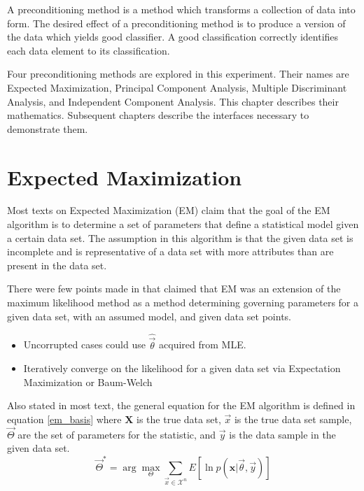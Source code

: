 \documentclass[12pt]{report}
\begin{document}
A preconditioning method is a method which transforms a collection of data into form.  The desired effect of a preconditioning method is to produce a version of the data which yields good classifier.  A good classification correctly identifies each data element to its classification.    

Four preconditioning methods are explored in this experiment.  Their names are Expected Maximization, Principal Component Analysis, Multiple Discriminant Analysis, and Independent Component Analysis.  This chapter describes their mathematics.  Subsequent chapters describe the interfaces necessary to demonstrate them.   %

\section{Expected Maximization}

Most texts on Expected Maximization (EM) claim that the goal of the EM algorithm is to determine a set of parameters that define a statistical model given a certain data set.   The assumption in this algorithm is that the given data set is incomplete and is representative of a data set with more attributes than are present in the data set.  %

There were few points made in \cite{duda-hart-stork} that claimed that EM was an extension of the maximum likelihood method as a method determining governing parameters for a given data set, with an assumed model, and given data set points.  
\begin{itemize}
	\item Uncorrupted cases could use $\hat{\vec{\theta}}$ acquired from MLE.
	\item Iteratively converge on the likelihood for a given data set via Expectation Maximization or Baum-Welch
\end{itemize}

Also stated in most text, the general equation for the EM algorithm is defined in equation \ref{em_basis} where $\mathbf{X}$ is the true data set, $\vec{x}$ is the true data set sample, $\vec{\Theta}$ are the set of parameters for the statistic, and $\vec{y}$ is the data sample in the given data set.
\begin{equation}
\vec{\Theta}^* = \arg \max_{\Theta} \sum_{\vec{x}\in \mathcal{X}^n} E[ \ln p( \mathbf{x} | \vec{\theta} ,\vec{y}) ] \label{em_basis}
\end{equation}
\end{document}
